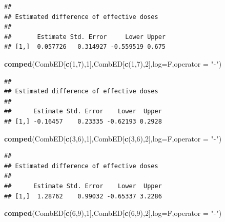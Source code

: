 \documentclass[letterpaper,]{book}
\newenvironment{Shaded}{\begin{snugshade}}{\end{snugshade}}
\newcommand{\DataTypeTok}[1]{\textcolor[rgb]{0.13,0.29,0.53}{#1}}
\newcommand{\DecValTok}[1]{\textcolor[rgb]{0.00,0.00,0.81}{#1}}
\newcommand{\KeywordTok}[1]{\textcolor[rgb]{0.13,0.29,0.53}{\textbf{#1}}}
\newcommand{\NormalTok}[1]{#1}
\newcommand{\StringTok}[1]{\textcolor[rgb]{0.31,0.60,0.02}{#1}}
\begin{document}
\begin{verbatim}
## 
## Estimated difference of effective doses
## 
##       Estimate Std. Error     Lower Upper
## [1,]  0.057726   0.314927 -0.559519 0.675
\end{verbatim}

\begin{Shaded}
\begin{Highlighting}[]
\KeywordTok{comped}\NormalTok{(CombED[}\KeywordTok{c}\NormalTok{(}\DecValTok{1}\NormalTok{,}\DecValTok{7}\NormalTok{),}\DecValTok{1}\NormalTok{],CombED[}\KeywordTok{c}\NormalTok{(}\DecValTok{1}\NormalTok{,}\DecValTok{7}\NormalTok{),}\DecValTok{2}\NormalTok{],}\DataTypeTok{log=}\NormalTok{F,}\DataTypeTok{operator =} \StringTok{"-"}\NormalTok{)}
\end{Highlighting}
\end{Shaded}

\begin{verbatim}
## 
## Estimated difference of effective doses
## 
##      Estimate Std. Error    Lower  Upper
## [1,] -0.16457    0.23335 -0.62193 0.2928
\end{verbatim}

\begin{Shaded}
\begin{Highlighting}[]
\KeywordTok{comped}\NormalTok{(CombED[}\KeywordTok{c}\NormalTok{(}\DecValTok{3}\NormalTok{,}\DecValTok{6}\NormalTok{),}\DecValTok{1}\NormalTok{],CombED[}\KeywordTok{c}\NormalTok{(}\DecValTok{3}\NormalTok{,}\DecValTok{6}\NormalTok{),}\DecValTok{2}\NormalTok{],}\DataTypeTok{log=}\NormalTok{F,}\DataTypeTok{operator =} \StringTok{"-"}\NormalTok{)}
\end{Highlighting}
\end{Shaded}

\begin{verbatim}
## 
## Estimated difference of effective doses
## 
##      Estimate Std. Error    Lower  Upper
## [1,]  1.28762    0.99032 -0.65337 3.2286
\end{verbatim}

\begin{Shaded}
\begin{Highlighting}[]
\KeywordTok{comped}\NormalTok{(CombED[}\KeywordTok{c}\NormalTok{(}\DecValTok{6}\NormalTok{,}\DecValTok{9}\NormalTok{),}\DecValTok{1}\NormalTok{],CombED[}\KeywordTok{c}\NormalTok{(}\DecValTok{6}\NormalTok{,}\DecValTok{9}\NormalTok{),}\DecValTok{2}\NormalTok{],}\DataTypeTok{log=}\NormalTok{F,}\DataTypeTok{operator =} \StringTok{"-"}\NormalTok{)}
\end{Highlighting}
\end{Shaded}
\end{document}
